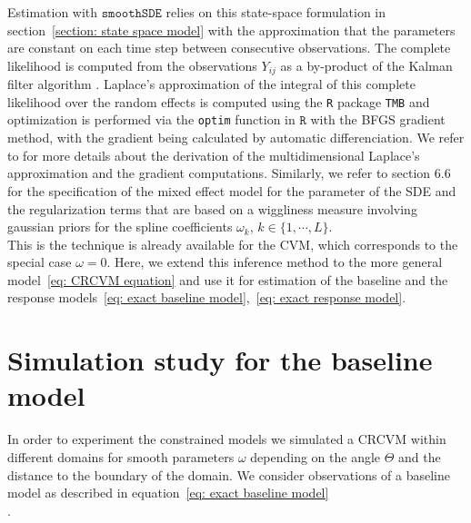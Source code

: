 \documentclass[11pt]{article}
\newcommand {\1}{\mathbb{1}}
\begin{document}
Estimation with $\texttt{smoothSDE}$ relies on this state-space formulation in section~\ref{section: state space model} with the approximation that the parameters are constant on each time step between consecutive observations.
The complete likelihood is computed from the observations $Y_{ij}$ as a by-product of the Kalman filter algorithm \cite{michelot_varying-coefficient_2021}.
Laplace's approximation of the integral of this complete likelihood over the random effects is computed using the \texttt{R} package \texttt{TMB}  and optimization is performed via the \texttt{optim} function in $\texttt{R}$ with the BFGS gradient method, with the gradient being calculated by automatic differenciation. We refer to \cite{kristensen_tmb_2016} for more details about the derivation of the multidimensional Laplace's approximation and the gradient computations. Similarly, we refer to \cite{wood_generalized_2017} section $6.6$ for the specification of the mixed effect model for the parameter of the SDE and the regularization terms that are based on a wiggliness measure involving gaussian priors for the spline coefficients $\omega_k$, $k \in \{1,\cdots,L\}$. \\
This is the technique is already available for the CVM, which corresponds to the special case $\omega=0$. Here, we extend this inference method to the more general model~\ref{eq: CRCVM equation} and use it for estimation of the baseline and the response models~\ref{eq: exact baseline model},~\ref{eq: exact response model}.




\section{Simulation study for the baseline model}
\label{section: simulation constrained motion}
In order to experiment the constrained models we simulated a CRCVM within different domains for smooth parameters $\omega$ depending on the angle $\Theta$ and the distance to the boundary of the domain. We consider observations of a baseline model as described in equation~\ref{eq: exact baseline model}\\.
\end{document}

